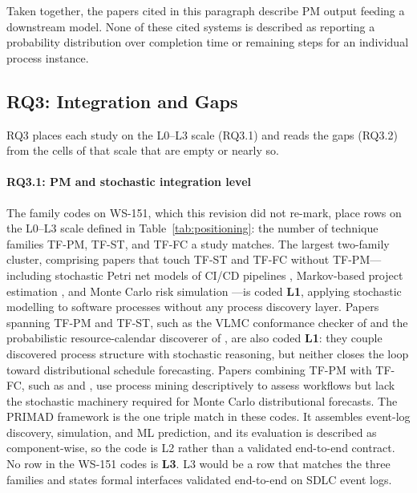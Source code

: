 Taken together, the papers cited in this paragraph describe PM output feeding
a downstream model. None of these cited systems is described as reporting a
probability distribution over completion time or remaining steps for an
individual process instance.


\subsection{RQ3: Integration and Gaps}
\label{sec:slr-rq3}

RQ3 places each study on the L0--L3 scale (RQ3.1) and reads the gaps
(RQ3.2) from the cells of that scale that are empty or nearly so.

\paragraph{RQ3.1: PM and stochastic integration level} The family codes on WS-151, which this
revision did not re-mark, place rows on the L0--L3 scale defined in
Table~\ref{tab:positioning}: the number of technique families TF-PM, TF-ST,
and TF-FC a study matches. The
largest two-family cluster, comprising papers that touch TF-ST and TF-FC
without TF-PM---including stochastic Petri net models of CI/CD pipelines
\cite{bhadra2022,bhadra2023}, Markov-based project estimation
\cite{massitela2018,tyagi2021}, and Monte Carlo risk simulation
\cite{lunesu2021,magennis2015}---is coded \textbf{L1},
applying stochastic modelling to software processes without any process
discovery layer. Papers spanning TF-PM and TF-ST, such as the VLMC conformance
checker of \cite{incerto2025} and the probabilistic resource-calendar discoverer
of \cite{lopezpintado2023}, are also coded \textbf{L1}: they couple discovered
process structure with stochastic reasoning, but neither closes the loop
toward distributional schedule forecasting. Papers combining TF-PM with TF-FC, such as
\cite{gupta2017} and \cite{caldeira2022}, use process mining descriptively to
assess workflows but lack the stochastic machinery required for Monte Carlo
distributional forecasts. The PRIMAD framework \cite{guinea2025} is the one
triple match in these codes. It assembles event-log discovery,
simulation, and ML prediction, and its evaluation is described as component-wise,
so the code is L2 rather than a validated end-to-end contract. No row
in the WS-151 codes is \textbf{L3}. L3 would be a row that matches the three
families and states formal interfaces validated end-to-end on SDLC event logs.

